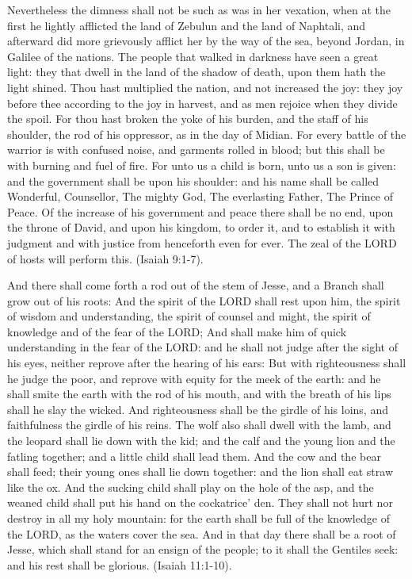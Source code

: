 Nevertheless the dimness shall not be such as was in her vexation, when
at the first he lightly afflicted the land of Zebulun and the land of Naphtali,
and afterward did more grievously afflict her by the way of the sea, beyond
Jordan, in Galilee of the nations. The people that walked in darkness have
seen a great light: they that dwell in the land of the shadow of death,
upon them hath the light shined. Thou hast multiplied the nation, and not
increased the joy: they joy before thee according to the joy in harvest,
and as men rejoice when they divide the spoil. For thou hast broken the
yoke of his burden, and the staff of his shoulder, the rod of his oppressor,
as in the day of Midian. For every battle of the warrior is with confused
noise, and garments rolled in blood; but this shall be with burning and
fuel of fire. For unto us a child is born, unto us a son is given: and
the government shall be upon his shoulder: and his name shall be called
Wonderful, Counsellor, The mighty God, The everlasting Father, The Prince
of Peace. Of the increase of his government and peace there shall be no
end, upon the throne of David, and upon his kingdom, to order it, and to
establish it with judgment and with justice from henceforth even for ever.
The zeal of the LORD of hosts will perform this. (Isaiah 9:1-7).

And there shall come forth a rod out of the stem of Jesse, and a Branch
shall grow out of his roots: And the spirit of the LORD shall rest upon
him, the spirit of wisdom and understanding, the spirit of counsel and
might, the spirit of knowledge and of the fear of the LORD; And shall make
him of quick understanding in the fear of the LORD: and he shall not judge
after the sight of his eyes, neither reprove after the hearing of his ears:
But with righteousness shall he judge the poor, and reprove with equity
for the meek of the earth: and he shall smite the earth with the rod of
his mouth, and with the breath of his lips shall he slay the wicked. And
righteousness shall be the girdle of his loins, and faithfulness the girdle
of his reins. The wolf also shall dwell with the lamb, and the leopard
shall lie down with the kid; and the calf and the young lion and the fatling
together; and a little child shall lead them. And the cow and the bear
shall feed; their young ones shall lie down together: and the lion shall
eat straw like the ox. And the sucking child shall play on the hole of
the asp, and the weaned child shall put his hand on the cockatrice' den.
They shall not hurt nor destroy in all my holy mountain: for the earth
shall be full of the knowledge of the LORD, as the waters cover the sea.
And in that day there shall be a root of Jesse, which shall stand for an
ensign of the people; to it shall the Gentiles seek: and his rest shall
be glorious. (Isaiah 11:1-10).

